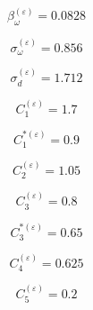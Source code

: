 {\newpage\clearpage
{}%
\begin{displaymath}
\beta_{\omega}^{(\varepsilon)} = 0.0828
\end{displaymath}%
\lthtmldisplayZ
\lthtmlcheckvsize\clearpage}

{\newpage\clearpage
{}%
\begin{displaymath}
\sigma_{\omega}^{(\varepsilon)} = 0.856
\end{displaymath}%
\lthtmldisplayZ
\lthtmlcheckvsize\clearpage}

{\newpage\clearpage
{}%
\begin{displaymath}
\sigma_d^{(\varepsilon)} = 1.712
\end{displaymath}%
\lthtmldisplayZ
\lthtmlcheckvsize\clearpage}

{\newpage\clearpage
{}%
\begin{displaymath}
C_1^{(\varepsilon)} = 1.7
\end{displaymath}%
\lthtmldisplayZ
\lthtmlcheckvsize\clearpage}

{\newpage\clearpage
{}%
\begin{displaymath}
C_1^{*(\varepsilon)} = 0.9
\end{displaymath}%
\lthtmldisplayZ
\lthtmlcheckvsize\clearpage}

{\newpage\clearpage
{}%
\begin{displaymath}
C_2^{(\varepsilon)} = 1.05
\end{displaymath}%
\lthtmldisplayZ
\lthtmlcheckvsize\clearpage}

{\newpage\clearpage
{}%
\begin{displaymath}
C_3^{(\varepsilon)} = 0.8
\end{displaymath}%
\lthtmldisplayZ
\lthtmlcheckvsize\clearpage}

{\newpage\clearpage
{}%
\begin{displaymath}
C_3^{*(\varepsilon)} = 0.65
\end{displaymath}%
\lthtmldisplayZ
\lthtmlcheckvsize\clearpage}

{\newpage\clearpage
{}%
\begin{displaymath}
C_4^{(\varepsilon)} = 0.625
\end{displaymath}%
\lthtmldisplayZ
\lthtmlcheckvsize\clearpage}

{\newpage\clearpage
{}%
\begin{displaymath}
C_5^{(\varepsilon)} = 0.2
\end{displaymath}%
\lthtmldisplayZ
\lthtmlcheckvsize\clearpage}

